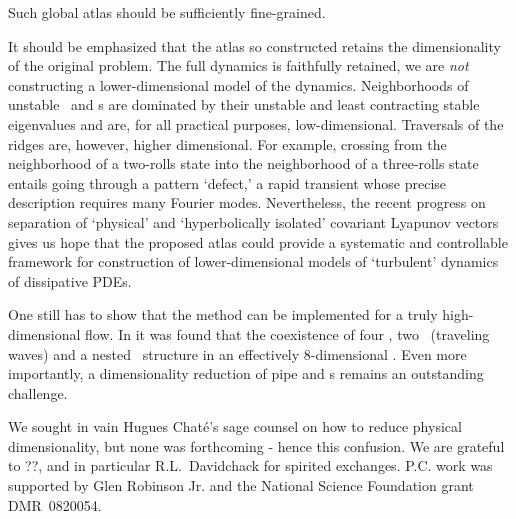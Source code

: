 Such global atlas should be sufficiently fine-grained.

It should be emphasized that the atlas so constructed retains the
dimensionality of the original problem. The full dynamics is faithfully
retained, we are \emph{not} constructing a lower-dimensional model of the
dynamics. Neighborhoods of unstable \eqva\ and \po s are dominated by
their unstable and least contracting stable eigenvalues and are, for all
practical purposes, low-dimensional. Traversals of the ridges are,
however, higher dimensional. For example, crossing from the neighborhood
of a two-rolls state into the neighborhood of a three-rolls state entails
going through a pattern `defect,' a rapid transient whose precise
description requires many Fourier modes. Nevertheless, the recent
progress on separation of `physical' and `hyperbolically isolated'
covariant Lyapunov
vectors gives us
hope that the proposed atlas could provide a systematic and controllable
framework for construction of lower-dimensional models of `turbulent'
dynamics of dissipative PDEs.

One still has to show that the method can be implemented for a truly
high-dimensional flow. In  it was found that the
coexistence of four \eqva, two \reqva\ (traveling waves) and a nested
\fixedsp\ structure in an effectively $8$-dimensional \KS. Even more
importantly, a dimensionality reduction of pipe and \pCf s remains an
outstanding challenge.


	\medskip
We sought in vain Hugues Chat\'e's sage counsel on how to reduce
physical dimensionality, but none was forthcoming - hence this
confusion.
We are grateful to
??,
and in particular R.L.~Davidchack
for spirited exchanges.
P.C. work was supported by  Glen Robinson Jr.
and the National Science Foundation grant
DMR~0820054. 	



\Remarks

